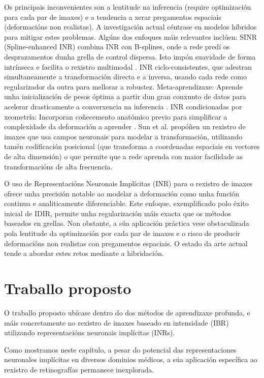 Os principais inconvenientes son a lentitude na inferencia (require optimización para cada par de imaxes) e a tendencia a xerar pregamentos espaciais (deformacións non realistas). A investigación actual céntrase en modelos híbridos para mitigar estes problemas.
Algúns dos enfoques máis relevantes inclúen:
SINR (Spline-enhanced INR) combina INR con B-splines, onde a rede predí os desprazamentos dunha grella de control dispersa. Isto impón suavidade de forma intrínseca e facilita o rexistro multimodal \cite{SINR}.   
INR ciclo-consistentes, que adestran simultaneamente a transformación directa e a inversa, usando cada rede como regularizador da outra para mellorar a robustez.  
Meta-aprendizaxe: Aprende unha inicialización de pesos óptima a partir dun gran conxunto de datos para acelerar drasticamente a converxencia na inferencia \cite{learnedinit}.  
INR condicionadas por xeometría: Incorporan coñecemento anatómico previo para simplificar a complexidade da deformación a aprender \cite{harten2023deformable}.  
Sun et al. \cite{sun2024medicalimageregistrationneural} propóñen un rexistro de imaxes que usa campos neuronais para modelar a transformación, utilizando tamén codificación posicional (que transforma a coordenadas espaciais en vectores de alta dimensión) o que permite que a rede aprenda con maior facilidade as transformacións de alta frecuencia.

O uso de Representacións Neuronais Implícitas (INR) para o rexistro de imaxes ofrece unha precisión notable ao modelar a deformación como unha función continua e analiticamente diferenciable. Este enfoque, exemplificado polo éxito inicial de IDIR, permite unha regularización máis exacta que os métodos baseados en grellas. Non obstante, a súa aplicación práctica vese obstaculizada pola lentitude da optimización por cada par de imaxes e o risco de producir deformacións non realistas con pregamentos espaciais. O estado da arte actual tende a abordar estes retos mediante a hibridación.

\section{Traballo proposto}
\label{sec:Traballo proposto}

O traballo proposto ubícase dentro do dos métodos de aprendizaxe profunda, e máis concretamente no rexistro de imaxes baseado en intensidade (IBR) utilizando representacións neuronais implícitas (INRs).

Como mostramos neste capítulo, a pesar do potencial das representaciones neuronales implícitas en diversos dominios médicos, a súa aplicación específica ao rexistro de retinografías permanece inexplorada.

